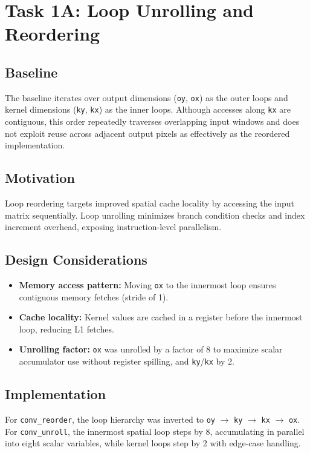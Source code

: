
\section{Task 1A: Loop Unrolling and Reordering}

\subsection{Baseline}
The baseline iterates over output dimensions (\texttt{oy}, \texttt{ox}) as the outer loops and kernel dimensions (\texttt{ky}, \texttt{kx}) as the inner loops. Although accesses along \texttt{kx} are contiguous, this order repeatedly traverses overlapping input windows and does not exploit reuse across adjacent output pixels as effectively as the reordered implementation.

\subsection{Motivation}
Loop reordering targets improved spatial cache locality by accessing the input matrix sequentially. Loop unrolling minimizes branch condition checks and index increment overhead, exposing instruction-level parallelism.

\subsection{Design Considerations}
\begin{itemize}
    \item \textbf{Memory access pattern:} Moving \texttt{ox} to the innermost loop ensures contiguous memory fetches (stride of 1).
    \item \textbf{Cache locality:} Kernel values are cached in a register before the innermost loop, reducing L1 fetches.
    \item \textbf{Unrolling factor:} \texttt{ox} was unrolled by a factor of 8 to maximize scalar accumulator use without register spilling, and \texttt{ky}/\texttt{kx} by 2.
\end{itemize}

\subsection{Implementation}
For \texttt{conv\_reorder}, the loop hierarchy was inverted to \texttt{oy} $\rightarrow$ \texttt{ky} $\rightarrow$ \texttt{kx} $\rightarrow$ \texttt{ox}. For \texttt{conv\_unroll}, the innermost spatial loop steps by 8, accumulating in parallel into eight scalar variables, while kernel loops step by 2 with edge-case handling.

